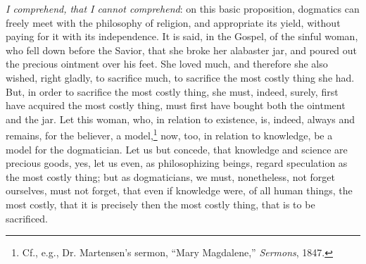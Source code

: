 \documentclass[12pt]{book}
\begin{document}
\emph{I comprehend, that I cannot comprehend}: on this basic proposition, dogmatics can freely meet with the philosophy of religion, and appropriate its yield, without paying for it with its independence. It is said, in the Gospel, of the sinful woman, who fell down before the Savior, that she broke her alabaster jar, and poured out the precious ointment over his feet. She loved much, and therefore she also wished, right gladly, to sacrifice much, to sacrifice the most costly thing she had. But, in order to sacrifice the most costly thing, she must, indeed, surely, first have acquired the most costly thing, must first have bought both the ointment and the jar. Let this woman, who, in relation to existence, is, indeed, always and remains, for the believer, a model,\footnote{Cf., e.g., Dr. Martensen's sermon, ``Mary Magdalene,'' \textit{Sermons}, 1847.} now, too, in relation to knowledge, be a model for the dogmatician. Let us but concede, that knowledge and science are precious goods, yes, let us even, as philosophizing beings, regard speculation as the most costly thing; but as dogmaticians, we must, nonetheless, not forget
ourselves, must not forget, that even if knowledge were, of all human things, the most costly, that it is precisely then the most costly thing, that is to be sacrificed.
\end{document}
